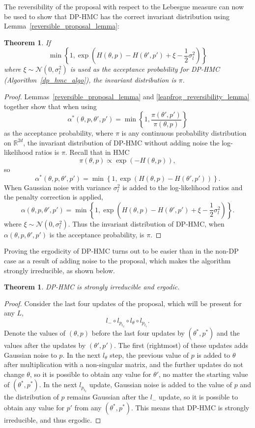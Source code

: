 \documentclass[english,twoside,openright]{HYgraduMLDS}
\newtheorem{theorem}[lemma]{Theorem}
\newcommand{\R}{\mathbb{R}}
\newcommand{\caln}{{\mathcal{N}}}
\begin{document}
The reversibility of the proposal with respect to the Lebesgue measure can now be
used to show that DP-HMC has the correct invariant
distribution using Lemma~\ref{reversible_proposal_lemma}:
\begin{theorem}\label{dp_hmc_invariant_theorem}
  If
  \[
    \min\left\{1, \exp\left(H(\theta, p) - H(\theta', p')
        + \xi - \frac{1}{2}\sigma_{l}^{2}\right)\right\}
  \]
  where \(\xi\sim \caln(0, \sigma_{l}^{2})\)
  is used as the acceptance probability for DP-HMC (Algorithm~\ref{dp_hmc_algo}),
  the invariant distribution is \(\pi\).
\end{theorem}
\begin{proof}
Lemmas~\ref{reversible_proposal_lemma} and \ref{leapfrog_reversibility_lemma}
together show that when using
\[
  \alpha^{*}(\theta, p, \theta', p')
  = \min\left\{1, \frac{\pi(\theta', p')}{\pi(\theta, p)}\right\}
\]
as the acceptance probability, where \(\pi\) is any continuous
probability distribution on \(\R^{2d}\), the invariant distribution
of DP-HMC without adding noise the log-likelihood ratios is \(\pi\).
Recall that in HMC
\[
  \pi(\theta, p) \propto \exp(-H(\theta, p)),
\]
so
\[
  \alpha^{*}(\theta, p, \theta', p')
  = \min\left\{1, \exp\left(H(\theta, p) - H(\theta', p')\right)\right\}.
\]
When Gaussian noise with variance \(\sigma_{l}^{2}\) is added to the
log-likelihood ratios and the penalty correction is applied,
  \[
    \alpha(\theta, p, \theta', p')
    = \min\left\{1, \exp\left(H(\theta, p) - H(\theta', p')
        + \xi - \frac{1}{2}\sigma_{l}^{2}\right)\right\}.
  \]
  where \(\xi\sim \caln(0, \sigma_{l}^{2})\). Thus the invariant distribution
  of DP-HMC, when \(\alpha(\theta, p, \theta', p')\) is the acceptance
  probability, is \(\pi\).
\end{proof}

Proving the ergodicity of DP-HMC turns out to be easier than in the
non-DP case as a result of adding noise to the proposal, which makes the
algorithm strongly irreducible, as shown below.
\begin{theorem}\label{dp_hmc_ergodicity_theorem}
	DP-HMC is strongly irreducible and ergodic.
\end{theorem}
\begin{proof}
  Consider the last four updates of the proposal, which will be present for any
  \(L\),
  \[
    l_{-}\circ l_{p_{t_{2}}}\circ l_{\theta}\circ l_{p_{t_{1}}}.
  \]
  Denote the values of \((\theta, p)\) before the last four updates by \((\theta^{*}, p^{*})\) and
  the values after the updates by \((\theta', p')\).
  The first (rightmost) of these updates adds Gaussian noise to \(p\). In the next
  \(l_{\theta}\) step, the previous value of \(p\) is added to \(\theta\)
  after multiplication with a non-singular matrix, and the further updates
  do not change \(\theta\), so it is possible
  to obtain any value for \(\theta'\), no matter the starting value of
  \((\theta^{*}, p^{*})\). In the next \(l_{p_{t_{2}}}\) update, Gaussian noise is
  added to the value of \(p\) and the distribution of \(p\) remains Gaussian
  after the \(l_{-}\) update, so it is possible to obtain any value
  for \(p'\) from any \((\theta^{*}, p^{*})\). This means that
  DP-HMC is strongly irreducible, and thus ergodic.
\end{proof}
\end{document}
